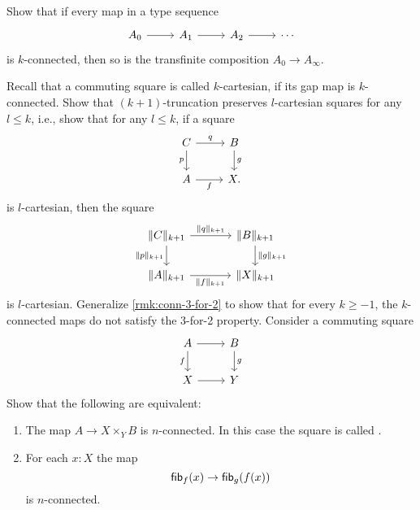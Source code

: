 \begin{exercises}
\begin{subexenum}
\item Show that if every map in a type sequence
  \begin{equation*}
    \begin{tikzcd}
      A_0\arrow[r] & A_1 \arrow[r] & A_2 \arrow[r] & \cdots
    \end{tikzcd}
  \end{equation*}
  is $k$-connected, then so is the transfinite composition $A_0\to A_\infty$.
\end{subexenum}
\exercise Recall that a commuting square is called $k$-cartesian, if its gap map is $k$-connected. Show that $(k+1)$-truncation preserves $l$-cartesian squares for any $l\leq k$, i.e., show that for any $l\leq k$, if a square
\begin{equation*}
  \begin{tikzcd}
    C \arrow[r,"q"] \arrow[d,swap,"p"] & B \arrow[d,"g"] \\
    A \arrow[r,swap,"f"] & X.
  \end{tikzcd}
\end{equation*}
is $l$-cartesian, then the square
\begin{equation*}
  \begin{tikzcd}[column sep=large]
    \trunc{k+1}{C} \arrow[r,"\trunc{k+1}{q}"] \arrow[d,swap,"\trunc{k+1}{p}"] & \trunc{k+1}{B} \arrow[d,"\trunc{k+1}{g}"] \\
    \trunc{k+1}{A} \arrow[r,swap,"\trunc{k+1}{f}"] & \trunc{k+1}{X}
  \end{tikzcd}
\end{equation*}
is $l$-cartesian.
\exercise Generalize \cref{rmk:conn-3-for-2} to show that for every $k\geq-1$, the $k$-connected maps do not satisfy the 3-for-2 property.
\exercise Consider a commuting square
\begin{equation*}
\begin{tikzcd}
A \arrow[d,swap,"f"] \arrow[r] & B \arrow[d,"g"] \\
X \arrow[r] & Y
\end{tikzcd}
\end{equation*}
Show that the following are equivalent:
\begin{enumerate}
\item The map $A\to X\times_Y B$ is $n$-connected. In this case the square is called .
\item For each $x:X$ the map
\begin{equation*}
\mathsf{fib}_{f}(x)\to \mathsf{fib}_{g}(f(x))
\end{equation*}
is $n$-connected.

\end{enumerate}
\end{exercises}
